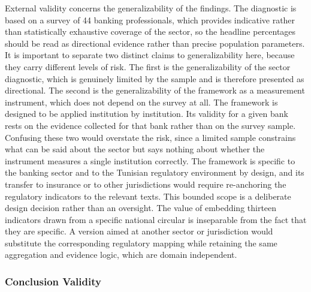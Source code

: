 External validity concerns the generalizability of the findings. The diagnostic is based on a survey of 44 banking professionals, which provides indicative rather than statistically exhaustive coverage of the sector, so the headline percentages should be read as directional evidence rather than precise population parameters. It is important to separate two distinct claims to generalizability here, because they carry different levels of risk. The first is the generalizability of the sector diagnostic, which is genuinely limited by the sample and is therefore presented as directional. The second is the generalizability of the framework as a measurement instrument, which does not depend on the survey at all. The framework is designed to be applied institution by institution. Its validity for a given bank rests on the evidence collected for that bank rather than on the survey sample. Confusing these two would overstate the risk, since a limited sample constrains what can be said about the sector but says nothing about whether the instrument measures a single institution correctly. The framework is specific to the banking sector and to the Tunisian regulatory environment by design, and its transfer to insurance or to other jurisdictions would require re-anchoring the regulatory indicators to the relevant texts. This bounded scope is a deliberate design decision rather than an oversight. The value of embedding thirteen indicators drawn from a specific national circular is inseparable from the fact that they are specific. A version aimed at another sector or jurisdiction would substitute the corresponding regulatory mapping while retaining the same aggregation and evidence logic, which are domain independent.

\subsubsection{Conclusion Validity}

